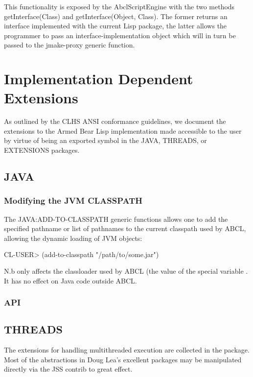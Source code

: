 \documentclass[10pt]{book}
\begin{document}
This functionality is exposed by the AbclScriptEngine with the two
methods getInterface(Class) and getInterface(Object, Class). The
former returns an interface implemented with the current Lisp package,
the latter allows the programmer to pass an interface-implementation
object which will in turn be passed to the jmake-proxy generic
function.

\chapter{Implementation Dependent Extensions}

As outlined by the CLHS ANSI conformance guidelines, we document the
extensions to the Armed Bear Lisp implementation made accessible to
the user by virtue of being an exported symbol in the JAVA, THREADS,
or EXTENSIONS packages.

\section{JAVA}

\subsection{Modifying the JVM CLASSPATH}

The JAVA:ADD-TO-CLASSPATH generic functions allows one to add the
specified pathname or list of pathnames to the current classpath
used by ABCL, allowing the dynamic loading of JVM objects:

\begin{listing-lisp}
CL-USER> (add-to-classpath "/path/to/some.jar")
\end{listing-lisp}

N.b  only affects the classloader used by ABCL
(the value of the special variable . It has
no effect on Java code outside ABCL.

\subsection{API}



\section{THREADS}

The extensions for handling multithreaded execution are collected in
the  package.  Most of the abstractions in Doug Lea's
excellent  packages may be manipulated
directly via the JSS contrib to great effect.
\end{document}
